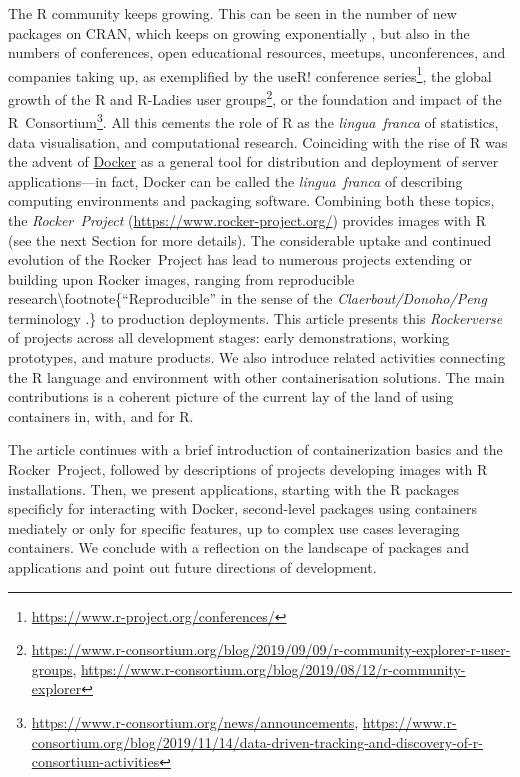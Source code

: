 The R community keeps growing. This can be seen in the number of new
packages on CRAN, which keeps on growing exponentially
\citep{cran:2019}, but also in the numbers of conferences, open
educational resources, meetups, unconferences, and companies taking up,
as exemplified by the useR! conference
series\footnote{\href{https://www.r-project.org/conferences/}{https://www.r-project.org/conferences/}},
the global growth of the R and R-Ladies user
groups\footnote{\href{https://www.r-consortium.org/blog/2019/09/09/r-community-explorer-r-user-groups}{https://www.r-consortium.org/blog/2019/09/09/r-community-explorer-r-user-groups}, \href{https://www.r-consortium.org/blog/2019/08/12/r-community-explorer}{https://www.r-consortium.org/blog/2019/08/12/r-community-explorer}},
or the foundation and impact of the
R~Consortium\footnote{\href{https://www.r-consortium.org/news/announcements}{https://www.r-consortium.org/news/announcements}, \href{https://www.r-consortium.org/blog/2019/11/14/data-driven-tracking-and-discovery-of-r-consortium-activities}{https://www.r-consortium.org/blog/2019/11/14/data-driven-tracking-and-discovery-of-r-consortium-activities}}.
All this cements the role of R as the \emph{lingua~franca} of
statistics, data visualisation, and computational research. Coinciding
with the rise of R was the advent of
\href{https://en.wikipedia.org/wiki/Docker_(software)}{Docker} as a
general tool for distribution and deployment of server applications---in
fact, Docker can be called the \emph{lingua~franca} of describing
computing environments and packaging software. Combining both these
topics, the \emph{Rocker~Project}
(\url{https://www.rocker-project.org/}) provides images with R (see the
next Section for more details). The considerable uptake and continued
evolution of the Rocker~Project has lead to numerous projects extending
or building upon Rocker images, ranging from reproducible
research\textbackslash{}footnote\{``Reproducible'' in the sense of the
\emph{Claerbout/Donoho/Peng} terminology
\citep{barba_terminologies_2018}.\} to production deployments. This
article presents this \emph{Rockerverse} of projects across all
development stages: early demonstrations, working prototypes, and mature
products. We also introduce related activities connecting the R language
and environment with other containerisation solutions. The main
contributions is a coherent picture of the current lay of the land of
using containers in, with, and for R.

The article continues with a brief introduction of containerization
basics and the Rocker~Project, followed by descriptions of projects
developing images with R installations. Then, we present applications,
starting with the R packages specificly for interacting with Docker,
second-level packages using containers mediately or only for specific
features, up to complex use cases leveraging containers. We conclude
with a reflection on the landscape of packages and applications and
point out future directions of development.

